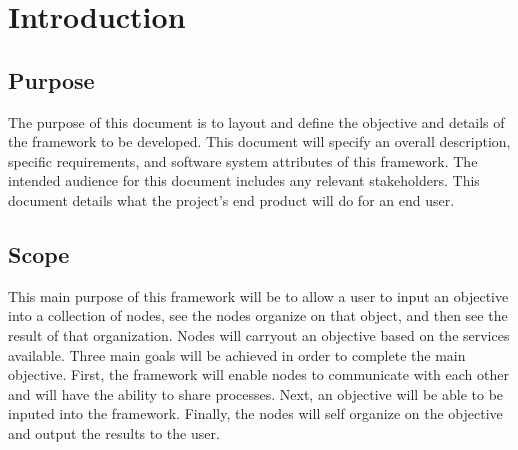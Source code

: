 \documentclass[draftclsnofoot, onecolumn, compsoc, 10pt]{IEEEtran}
\begin{document}
\section{Introduction}
\subsection{Purpose} 
The purpose of this document is to layout and define the objective and details of the framework to be developed. This document will specify an overall description, specific requirements, and software system attributes of this framework. The intended audience for this document includes any relevant stakeholders. This document details what the project's end product will do for an end user.

\subsection{Scope}
This main purpose of this framework will be to allow a user to input an objective into a collection of nodes, see the nodes organize on that object, and then see the result of that organization. Nodes will carryout an objective based on the services available. Three main goals will be achieved in order to complete the main objective. First, the framework will enable nodes to communicate with each other and will have the ability to share processes. Next, an objective will be able to be inputed into the framework. Finally, the nodes will self organize on the objective and output the results to the user.
\end{document}
